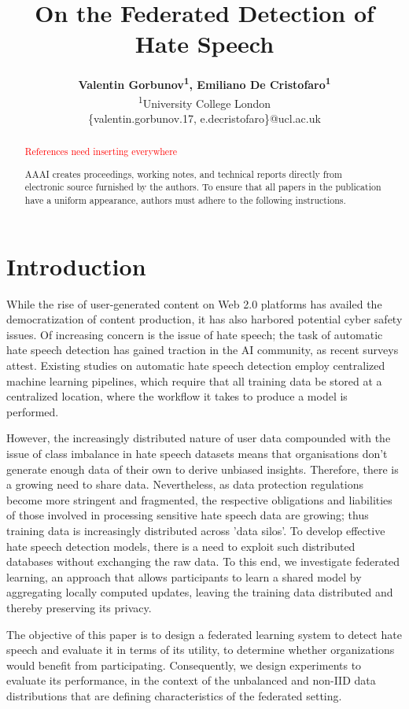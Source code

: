 \documentclass[letterpaper]{article} %
\title{On the Federated Detection of Hate Speech}
\author{\Large \textbf{Valentin Gorbunov\textsuperscript{\rm 1}, Emiliano De Cristofaro\textsuperscript{\rm 1}}\\
\textsuperscript{\rm 1}University College London\\
\{valentin.gorbunov.17, e.decristofaro\}@ucl.ac.uk}
\begin{document}
\maketitle

\begin{abstract}
\textcolor{red}{References need inserting everywhere}

AAAI creates proceedings, working notes, and technical reports directly from electronic source furnished by the authors. To ensure that all papers in the publication have a uniform appearance, authors must adhere to the following instructions. 
\end{abstract}

\section{Introduction}
While the rise of user-generated content on Web 2.0 platforms has availed the democratization of content production, it has also harbored potential cyber safety issues. Of increasing concern is the issue of hate speech; the task of automatic hate speech detection has gained traction in the AI community, as recent surveys attest. Existing studies on automatic hate speech detection employ centralized machine learning pipelines, which require that all training data be stored at a centralized location, where the workflow it takes to produce a model is performed. \par
However, the increasingly distributed nature of user data compounded with the issue of class imbalance in hate speech datasets means that organisations don't generate enough data of their own to derive unbiased insights. Therefore, there is a growing need to share data. Nevertheless, as data protection regulations become more stringent and fragmented, the respective obligations and liabilities of those involved in processing sensitive hate speech data are growing; thus training data is increasingly distributed across 'data silos'. To develop effective hate speech detection models, there is a need to exploit such distributed databases without exchanging the raw data. To this end, we investigate federated learning, an approach that allows participants to learn a shared model by aggregating locally computed updates, leaving the training data distributed and thereby preserving its privacy.\par
The objective of this paper is to design a federated learning system to detect hate speech and evaluate it in terms of its utility, to determine whether organizations would benefit from participating. Consequently, we design experiments to evaluate its performance, in the context of the unbalanced and non-IID data distributions that are defining characteristics of the federated setting.
\end{document}
